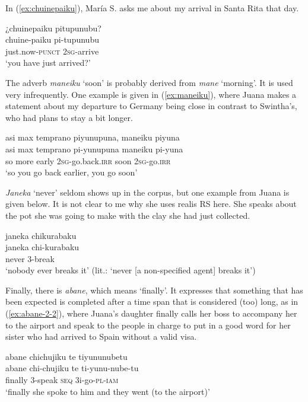 In (\ref{ex:chuinepaiku}), María S. asks me about my arrival in Santa Rita that day.

\ea\label{ex:chuinepaiku}
\begingl
\glpreamble ¿chuinepaiku pitupunubu?\\
\gla chuine-paiku pi-tupunubu\\
\glb just.now-\textsc{punct} 2\textsc{sg}-arrive\\
\glft ‘you have just arrived?’
\endgl
\trailingcitation{[rxx-e120511l.005]}
\xe

The adverb \textit{maneiku} ‘soon’ is probably derived from \textit{mane} ‘morning’. It is used very infrequently. One example is given in (\ref{ex:maneiku}), where Juana makes a statement about my departure to Germany being close in contrast to Swintha’s, who had plans to stay a bit longer.

\ea\label{ex:maneiku}
\begingl
\glpreamble asi max temprano piyunupuna, maneiku piyuna\\
\gla asi max temprano pi-yunupuna maneiku pi-yuna\\
\glb so more early 2\textsc{sg}-go.back.\textsc{irr} soon 2\textsc{sg}-go.\textsc{irr}\\
\glft ‘so you go back earlier, you go soon’
\endgl
\trailingcitation{[jxx-p120430l-2.635]}
\xe

\textit{Janeka} ‘never’ seldom shows up in the corpus, but one example from Juana is given below. It is not clear to me why she uses realis RS here. She speaks about the pot she was going to make with the clay she had just collected.

\ea\label{ex:janeka}
\begingl
\glpreamble janeka chikurabaku\\
\gla janeka chi-kurabaku\\
\glb never 3-break\\
\glft ‘nobody ever breaks it’ (lit.: ‘never [a non-specified agent] breaks it’)
\endgl
\trailingcitation{[jmx-d110918ls-1.078]}
\xe


Finally, there is \textit{abane}, which means ‘finally’. It expresses that something that has been expected is completed after a time span that is considered (too) long, as in (\ref{ex:abane-2-2}), where Juana’s daughter finally calls her boss to accompany her to the airport and speak to the people in charge to put in a good word for her sister who had arrived to Spain without a valid visa.

\ea\label{ex:abane-2-2}
\begingl
\glpreamble abane chichujiku te tiyununubetu\\
\gla abane chi-chujiku te ti-yunu-nube-tu\\
\glb finally 3-speak \textsc{seq} 3i-go-\textsc{pl}-\textsc{iam}\\
\glft ‘finally she spoke to him and they went (to the airport)’
\endgl
\trailingcitation{[jxx-p110923l-1.351]}
\xe
{}


